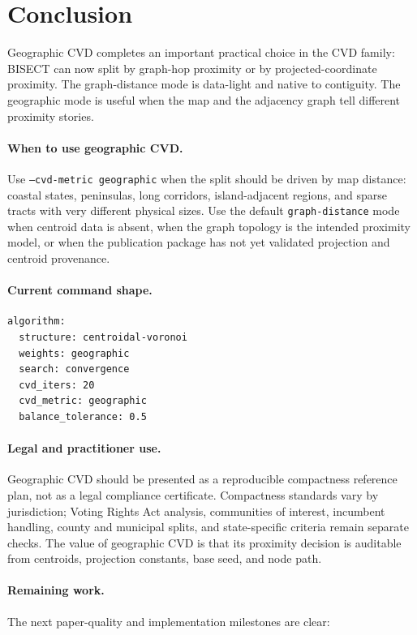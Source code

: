 \section{Conclusion}
\label{sec:conclusion}

Geographic CVD completes an important practical choice in the CVD family:
BISECT can now split by graph-hop proximity or by projected-coordinate
proximity. The graph-distance mode is data-light and native to contiguity.
The geographic mode is useful when the map and the adjacency graph tell
different proximity stories.

\paragraph{When to use geographic CVD.}
Use \texttt{--cvd-metric geographic} when the split should be driven by map
distance: coastal states, peninsulas, long corridors, island-adjacent regions,
and sparse tracts with very different physical sizes. Use the default
\texttt{graph-distance} mode when centroid data is absent, when the graph
topology is the intended proximity model, or when the publication package has
not yet validated projection and centroid provenance.

\paragraph{Current command shape.}
\begin{verbatim}
algorithm:
  structure: centroidal-voronoi
  weights: geographic
  search: convergence
  cvd_iters: 20
  cvd_metric: geographic
  balance_tolerance: 0.5
\end{verbatim}

\paragraph{Legal and practitioner use.}
Geographic CVD should be presented as a reproducible compactness reference
plan, not as a legal compliance certificate. Compactness standards vary by
jurisdiction; Voting Rights Act analysis, communities of interest, incumbent
handling, county and municipal splits, and state-specific criteria remain
separate checks. The value of geographic CVD is that its proximity decision is
auditable from centroids, projection constants, base seed, and node path.

\paragraph{Remaining work.}
The next paper-quality and implementation milestones are clear:

